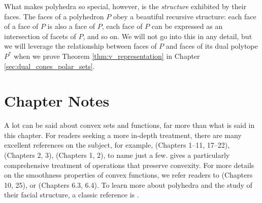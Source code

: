 What makes polyhedra so special, however, is the \emph{structure} exhibited by
their faces. The faces of a polyhedron $P$ obey a beautiful recursive 
structure: each face of a face of $P$ is also a face of $P$, each face of $P$
can be expressed as an intersection of facets of $P$, and so on. 
We will not go into this in any detail, but we will leverage the relationship
between faces of $P$ and faces of its dual polytope $P^*$ when we prove
Theorem \ref{thm:v_representation} in Chapter \ref{sec:dual_cones_polar_sets}. 

\SkipTocEntry\section*{Chapter Notes}

A lot can be said about convex sets and functions, far more than what is said in
this chapter. For readers seeking a more in-depth treatment, there are many
excellent references on the subject, for example, 
\cite{rockafellar1970convex} (Chapters 1--11, 17--22), \cite{boyd2004convex}  
(Chapters 2, 3), \cite{bertsekas2009convex} (Chapters 1, 2), to name just a
few. \cite{boyd2004convex} gives a particularly comprehensive treatment of  
operations that preserve convexity. For more details on the smoothness
properties of convex functions, we refer readers to \cite{rockafellar1970convex}
(Chapters 10, 25), or \cite{evans2015measure} (Chapters 6.3, 6.4). To learn
more about polyhedra and the study of their facial structure, a classic
reference is \cite{grunbaum2003convex}.      

